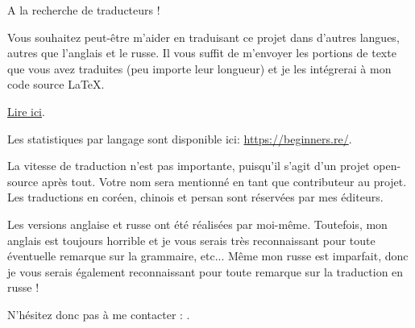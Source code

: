 ﻿\vspace*{\fill}

\Huge A la recherche de traducteurs !

\normalsize

\bigskip
\bigskip
\bigskip

Vous souhaitez peut-être m'aider en traduisant ce projet dans d'autres langues, autres que l'anglais et le russe.
Il vous suffit de m'envoyer les portions de texte que vous avez traduites (peu importe leur longueur) et je les intégrerai à mon code source LaTeX.

\href{\GitHubBlobMasterURL/Translation.md}{Lire ici}.

Les statistiques par langage sont disponible ici: \url{https://beginners.re/}.

La vitesse de traduction n'est pas importante, puisqu'il s'agit d'un projet open-source après tout.
Votre nom sera mentionné en tant que contributeur au projet.
Les traductions en coréen, chinois et persan sont réservées par mes éditeurs.

Les versions anglaise et russe ont été réalisées par moi-même.
Toutefois, mon anglais est toujours horrible et je vous serais très reconnaissant pour toute éventuelle remarque sur la grammaire, etc...
Même mon russe est imparfait, donc je vous serais également reconnaissant pour toute remarque sur la traduction en russe !%

N'hésitez donc pas à me contacter : \GTT{\EMAIL}.

\vspace*{\fill}
\vfill
